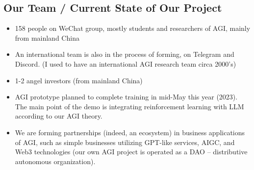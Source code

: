 \begin{preview}
\begin{minipage}{\textwidth}
	\setlength{\parskip}{0.4\baselineskip}

\section{Our Team / Current State of Our Project}

\begin{itemize}
	\item 158 people on WeChat group, mostly students and researchers of AGI, mainly from mainland China
	
	\item An international team is also in the process of forming, on Telegram and Discord. (I used to have an international AGI research team circa 2000's)
	
	\item 1-2 angel investors (from mainland China)

	\item AGI prototype planned to complete training in mid-May this year (2023).  The main point of the demo is integrating reinforcement learning with LLM according to our AGI theory.

	\item We are forming partnerships (indeed, an ecosystem) in business applications of AGI, such as simple businesses utilizing GPT-like services, AIGC, and Web3 technologies (our own AGI project is operated as a DAO -- distributive autonomous organization).

\end{itemize}

\end{minipage}
\end{preview}

